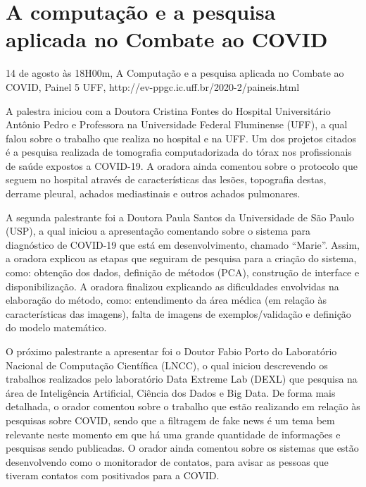 \section{A computação e a pesquisa aplicada no Combate ao COVID}

\begin{center}
  \vspace{1cm}
  14 de agosto às 18H00m, A Computação e a pesquisa aplicada no Combate ao COVID, Painel 5 UFF, http://ev-ppgc.ic.uff.br/2020-2/paineis.html
  \vspace{1cm}
\end{center}

A palestra iniciou com a Doutora Cristina Fontes do Hospital Universitário Antônio Pedro e Professora na Universidade Federal Fluminense (UFF), a qual falou sobre o trabalho que realiza no hospital e na UFF. Um dos projetos citados é a pesquisa realizada de tomografia computadorizada do tórax nos profissionais de saúde expostos a COVID-19. A oradora ainda comentou sobre o protocolo que seguem no hospital através de características das lesões, topografia destas, derrame pleural, achados mediastinais e outros achados pulmonares.

A segunda palestrante foi a Doutora Paula Santos da Universidade de São Paulo (USP), a qual iniciou a apresentação comentando sobre o sistema para diagnóstico de COVID-19 que está em desenvolvimento, chamado “Marie”. Assim, a oradora explicou as etapas que seguiram de pesquisa para a criação do sistema, como: obtenção dos dados, definição de métodos (PCA), construção de interface e disponibilização. A oradora finalizou explicando as dificuldades envolvidas na elaboração do método, como: entendimento da área médica (em relação às características das imagens), falta de imagens de exemplos/validação e definição do modelo matemático.

O próximo palestrante a apresentar foi o Doutor Fabio Porto do Laboratório Nacional de Computação Científica (LNCC), o qual iniciou descrevendo os trabalhos realizados pelo laboratório Data Extreme Lab (DEXL) que pesquisa na área de Inteligência Artificial, Ciência dos Dados e Big Data. De forma mais detalhada, o orador comentou sobre o trabalho que estão realizando em relação às pesquisas sobre COVID, sendo que a filtragem de fake news é um tema bem relevante neste momento em que há uma grande quantidade de informações e pesquisas sendo publicadas. O orador ainda comentou sobre os sistemas que estão desenvolvendo como o monitorador de contatos, para avisar as pessoas que tiveram contatos com positivados para a COVID.

